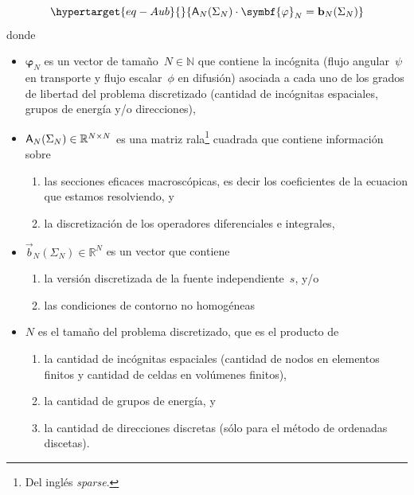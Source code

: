 \documentclass[
  12pt,
  a4paper,
  table]{scrbook}
\providecommand{\tightlist}{%
  \setlength{\itemsep}{0pt}\setlength{\parskip}{0pt}}\usepackage{longtable,booktabs,array}
\theoremstyle{plain}
\theoremstyle{definition}
\theoremstyle{plain}
\theoremstyle{plain}
\theoremstyle{remark}
\begin{document}
\begin{equation}\protect\hypertarget{eq-Aub}{}{
\mat{A}_N(\Sigma_N) \cdot \symbf{\varphi}_N = \vec{b}_N(\Sigma_N)
}\label{eq-Aub}\end{equation} donde

\begin{itemize}
\tightlist
\item
  \(\symbf{\varphi}_N\) es un vector de tamaño~\(N \in \mathbb{N}\) que
  contiene la incógnita (flujo angular~\(\psi\) en transporte y flujo
  escalar~\(\phi\) en difusión) asociada a cada uno de los grados de
  libertad del problema discretizado (cantidad de incógnitas espaciales,
  grupos de energía y/o direcciones),
\item
  \(\mathsf{A}_N(\Sigma_N) \in \mathbb{R}^{N \times N}\) es una matriz
  rala\footnote{Del inglés \foreignlanguage{american}{\emph{sparse}}.}
  cuadrada que contiene información sobre

  \begin{enumerate}
  \def\labelenumi{\alph{enumi}.}
  \tightlist
  \item
    las secciones eficaces macroscópicas, es decir los coeficientes de
    la ecuacion que estamos resolviendo, y
  \item
    la discretización de los operadores diferenciales e integrales,
  \end{enumerate}
\item
  \(\vec{b}_N(\Sigma_N) \in \mathbb{R}^N\) es un vector que contiene

  \begin{enumerate}
  \def\labelenumi{\alph{enumi}.}
  \tightlist
  \item
    la versión discretizada de la fuente independiente~\(s\), y/o
  \item
    las condiciones de contorno no homogéneas
  \end{enumerate}
\item
  \(N\) es el tamaño del problema discretizado, que es el producto de

  \begin{enumerate}
  \def\labelenumi{\alph{enumi}.}
  \tightlist
  \item
    la cantidad de incógnitas espaciales (cantidad de nodos en elementos
    finitos y cantidad de celdas en volúmenes finitos),
  \item
    la cantidad de grupos de energía, y
  \item
    la cantidad de direcciones discretas (sólo para el método de
    ordenadas discetas).
  \end{enumerate}
\end{itemize}
\end{document}
